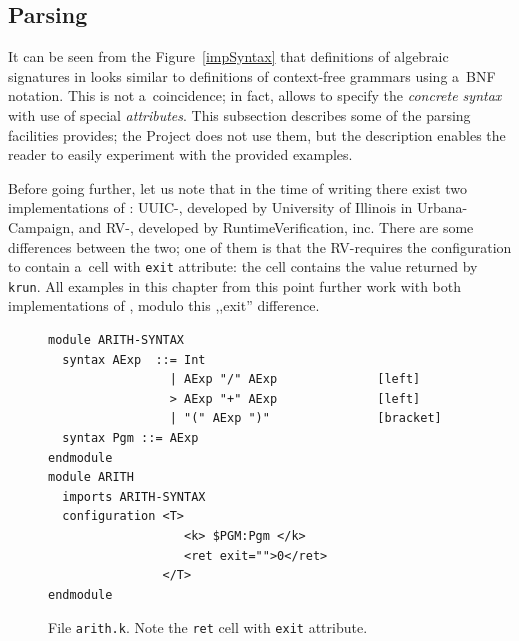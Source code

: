 \documentclass{fithesis3}
\newcommand{\krun}{\texttt{krun}\xspace}
\newcommand{\Project}{Project\xspace}
\begin{document}

\subsection{Parsing}
It can be seen from the Figure~\ref{impSyntax} that definitions of algebraic signatures in \K looks similar to definitions of context-free grammars using a~BNF notation. This is not a~coincidence; in fact, \K allows to specify the \textit{concrete syntax} with use of special \textit{attributes}. This subsection describes some of the parsing facilities \K provides; the \Project does not use them, but the description enables the reader to easily experiment with the provided examples.

Before going further, let us note that in the time of writing there exist two implementations of \K: UUIC-\K, developed by University of Illinois in Urbana-Campaign, and RV-\K, developed by RuntimeVerification, inc. There are some differences between the two; one of them is that the RV-\K requires the configuration to contain a~cell with \texttt{exit} attribute: the cell contains the value returned by \krun. All examples in this chapter from this point further work with both implementations of \K, modulo this ,,exit'' difference.

\begin{figure}
\begin{lstlisting}
module ARITH-SYNTAX
  syntax AExp  ::= Int
                 | AExp "/" AExp              [left]
                 > AExp "+" AExp              [left]
                 | "(" AExp ")"               [bracket]
  syntax Pgm ::= AExp
endmodule
module ARITH
  imports ARITH-SYNTAX  
  configuration <T>
                   <k> $PGM:Pgm </k>
                   <ret exit="">0</ret>
                </T>
endmodule
\end{lstlisting}
\caption{File \texttt{arith.k}. Note the \texttt{ret} cell with \texttt{exit} attribute.}
\label{arithSource}
\end{figure}
\end{document}
